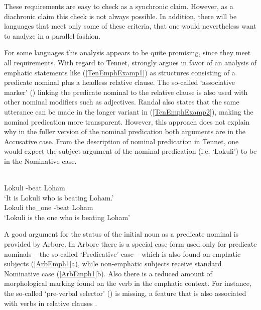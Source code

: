 These requirements are easy to check as a synchronic claim. 
However, as a diachronic claim this check is not always possible.
In addition, there will be languages that meet only some of these criteria, that one would nevertheless want to analyze in a parallel fashion.

For some languages this analysis appears to be quite promising, since they meet all requirements. 
With regard to Tennet, \citet[261]{Randal:1998} strongly argues in favor of an analysis of emphatic statements like (\ref{TenEmphExamp1}) as structures consisting of a predicate nominal plus a headless relative clause. 
The so-called `associative marker' (\am{}) linking the predicate nominal to the relative clause is also used with other nominal modifiers such as adjectives. 
Randal also states that the same utterance can be made in the longer variant in (\ref{TenEmphExamp2}), making the nominal predication more transparent. 
However, this approach does not explain why in the fuller version of the nominal predication both arguments are in the Accusative case. 
From the description of nominal predication in Tennet, one would expect the subject argument of the nominal predication (i.e. `Lokuli') to be in the Nominative case.

\begin{exe}\ex{}
\begin{xlist}
\ex\label{TenEmphExamp1}\gll{}   \\
Lokuli \am{} \ipfv{}-beat Loham\\
\glt `It is Lokuli who is beating Loham.' 
\ex\label{TenEmphExamp2}\gll{}    \\
Lokuli the\_one \am{} \ipfv{}-beat Loham\\
\glt `Lokuli is the one who is beating Loham' 
\end{xlist}
\end{exe}

A good argument for the status of the initial noun as a predicate nominal is provided by Arbore.
In Arbore there is a special case-form used only for predicate nominals -- the so-called `Predicative' case -- which is also found on emphatic subjects (\ref{ArbEmph1}a), while non-emphatic subjects receive standard Nominative case (\ref{ArbEmph1}b). 
Also there is a reduced amount of morphological marking found on the verb in the emphatic context. 
For instance, the so-called `pre-verbal selector' (\pvs{}) is missing, a feature that is also associated with verbs in relative clauses \citep[315]{Hayward:1984}. 

